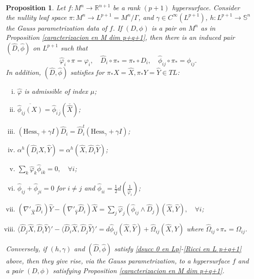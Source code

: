 \documentclass{article}
\newtheorem{prop}[thm]{Proposition}
\theoremstyle{remark}
\begin{document}
\begin{prop}\label{Caracterizacion en Lp+q+1}
    Let $f:M^n\rightarrow\mathbb{R}^{n+1}$ be a rank $(p+1)$ hypersurface. Consider the nullity leaf space $\pi:M^n\rightarrow L^{p+1}=M^n/\Gamma$, and $\gamma\in C^\infty(L^{p+1})$, $h:L^{p+1}\rightarrow\mathbb{S}^n$ the Gauss parametrization data of $f$. If $(D,\phi)$ is a pair on $M^n$ as in Proposition \ref{caracterizacion en M dim p+q+1}, then there is an induced pair $(\hat{D},\hat{\phi})$ on $L^{p+1}$ such that 
    $$\hat{\varphi}_i\circ\pi=\varphi_i,\quad\hat{D}_i\circ\pi_{*}=\pi_{*}\circ D_i,\quad\hat{\phi}_{ij}\circ\pi_{*}=\phi_{ij}.$$
    In addition, $(\hat{D},\hat{\phi})$ satisfies for $\pi_{*}X=\hat{X},\pi_{*}Y=\hat{Y}\in TL$:
    \begin{enumerate}[i)]
        \item $\hat{\varphi}$ is admissible of index $\mu$;\label{dsucc 0 en Lp}
        \item $\overline{\hat{\phi}_{ij}(X)}=\hat{\phi}_{\overline{i}\,\overline{j}}(\overline{\hat{X}})$;\label{varphi y phi admisibles en L}
        \item $(\text{Hess}_\gamma+\gamma I)\hat{D}_i=\hat{D}_i^t(\text{Hess}_\gamma+\gamma I)$;\label{hess gamma D simetrico caso p+q+1}
        \item $\alpha^h(\hat{D}_i \hat{X},\hat{Y})=\alpha^h(\hat{X},\hat{D}_i \hat{Y})$;\label{alpha Di p+q+1}
        \item $\sum_k\hat{\varphi}_{k}\hat{\phi}_{ik}=0,\quad \forall i$; \label{kernel de S esta en el kernel de phi en Lp+1}
        \item $\hat{\phi}_{ij}+\hat{\phi}_{ji}=0$ for $i\neq j$ and $\hat{\phi}_{ii}=\frac{1}{2}d(\frac{1}{\hat{\varphi}_i})$; \label{compatibilidad de conexion en Lp+q+1}
        \item $(\nabla'_{\hat{X}}\hat{D}_i)\hat{Y}-(\nabla'_{\hat{Y}}\hat{D}_i)\hat{X}=\sum_{j}\hat{\varphi}_j(\hat{\phi}_{ij}\wedge\hat{D}_j)(\hat{X},\hat{Y}),\quad\forall i$;\label{codazzi en Lp+q+1}
        
        \item $\langle \hat{D}_j\hat{X},\hat{D}_i \hat{Y}\rangle'-\langle \hat{D}_i \hat{X},\hat{D}_j \hat{Y}\rangle'=d\hat{\phi}_{ij}(\hat{X},\hat{Y})+\hat{\Omega}_{ij}(\hat{X},\hat{Y})$ where $\hat{\Omega}_{ij}\circ\pi_{*}=\Omega_{ij}$. \label{Ricci en L p+q+1}
    \end{enumerate}
    Conversely, if $(h,\gamma)$ and $(\hat{D},\hat{\phi})$ satisfy \ref{dsucc 0 en Lp}-\ref{Ricci en L p+q+1} above, then they give rise, via the Gauss parametrization, to a hypersurface $f$ and a pair $(D,\phi)$ satisfying Proposition \ref{caracterizacion en M dim p+q+1}.
\end{prop}
\end{document}
